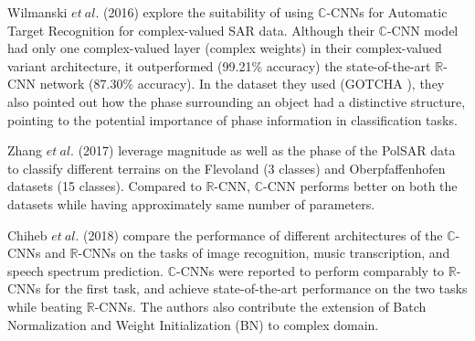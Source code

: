 Wilmanski $et \ al.$ (2016) \cite{wilmanski2016complex} explore the suitability of using $\mathbb{C}$-CNNs for Automatic Target Recognition for complex-valued SAR data. Although their $\mathbb{C}$-CNN model had only one complex-valued layer (complex weights) in their complex-valued variant architecture, it outperformed (99.21\% accuracy) the state-of-the-art $\mathbb{R}$-CNN network (87.30\% accuracy). In the dataset they used (GOTCHA \cite{gotcha}), they also pointed out how the phase surrounding an object had a distinctive structure, pointing to the potential importance of phase information in classification tasks.

Zhang $et \ al.$ (2017) \cite{polsarzhang2017complex} leverage magnitude as well as the phase of the PolSAR data to classify different terrains on the Flevoland (3 classes) and Oberpfaffenhofen datasets (15 classes). Compared to $\mathbb{R}$-CNN, $\mathbb{C}$-CNN performs better on both the datasets while having approximately same number of parameters.  

Chiheb $et \ al.$ (2018) \cite{trabelsi2018deep} compare the performance of different architectures of the $\mathbb{C}$-CNNs and $\mathbb{R}$-CNNs on the tasks of image recognition, music transcription, and speech spectrum prediction. $\mathbb{C}$-CNNs were reported to perform comparably to $\mathbb{R}$-CNNs for the first task, and achieve state-of-the-art performance on the two tasks while beating $\mathbb{R}$-CNNs. The authors also contribute the extension of Batch Normalization and Weight Initialization (BN) to complex domain. 